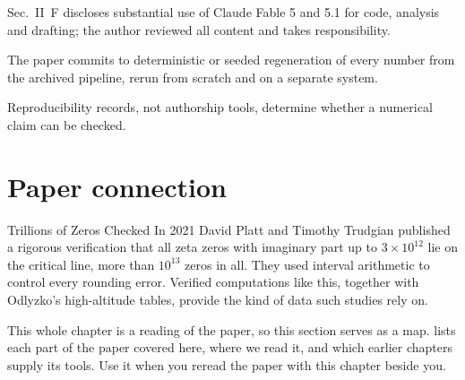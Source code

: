 \begin{keyideas}
\item Sec.~II~F discloses substantial use of Claude Fable 5 and 5.1 for code, analysis and drafting; the author reviewed all content and takes responsibility.
\item The paper commits to deterministic or seeded regeneration of every number from the archived pipeline, rerun from scratch and on a separate system.
\item Reproducibility records, not authorship tools, determine whether a numerical claim can be checked.
\end{keyideas}

\section{Paper connection}\label{sec:paper-setup-paper}
\begin{didyouknow}{Trillions of Zeros Checked}
In 2021 David Platt and Timothy Trudgian published a rigorous verification that all zeta zeros with imaginary part up to $3\times10^{12}$ lie on the critical line, more than $10^{13}$ zeros in all. They used interval arithmetic to control every rounding error. Verified computations like this, together with Odlyzko's high-altitude tables, provide the kind of data such studies rely on.
\end{didyouknow}

This whole chapter is a reading of the paper, so this section serves as a map.  lists each part of the paper covered here, where we read it, and which earlier chapters supply its tools. Use it when you reread the paper with this chapter beside you.

